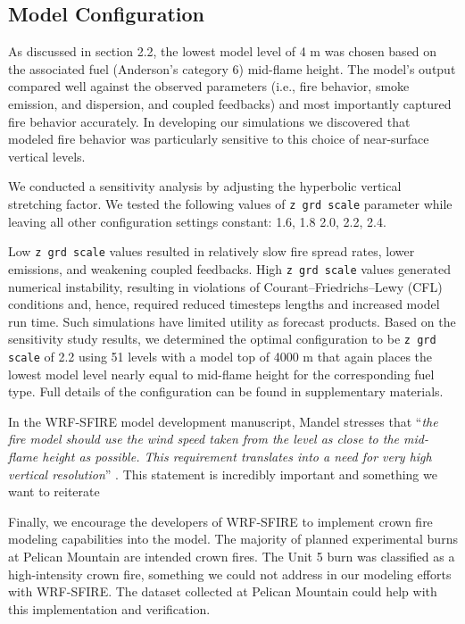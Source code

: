 \documentclass[preprints,article,accept,moreauthors,pdftex]{Definitions/mdpi}
\begin{document}
\subsection{Model Configuration}

As discussed in section 2.2, the lowest model level of 4 m was chosen based on the associated fuel (Anderson's category 6) mid-flame height. The model’s output compared well against the observed parameters (i.e., fire behavior, smoke emission, and dispersion, and coupled feedbacks) and most importantly captured fire behavior accurately. In developing our simulations we discovered that modeled fire behavior was particularly sensitive to this choice of near-surface vertical levels.

We conducted a sensitivity analysis by adjusting the hyperbolic vertical stretching factor. We tested the following values of \texttt{z grd scale} parameter while leaving all other configuration settings constant: 1.6, 1.8 2.0, 2.2, 2.4.

Low \texttt{z grd scale} values resulted in relatively slow fire spread rates, lower emissions, and weakening coupled feedbacks. High \texttt{z grd scale} values generated numerical instability, resulting in violations of Courant–Friedrichs–Lewy (CFL) conditions and, hence, required reduced timesteps lengths and increased model run time. Such simulations have limited utility as forecast products. Based on the sensitivity study results, we determined the optimal configuration to be \texttt{z grd scale} of 2.2 using 51 levels with a model top of 4000 m that again places the lowest model level nearly equal to mid-flame height for the corresponding fuel type. Full details of the configuration can be found in supplementary materials.

In the WRF-SFIRE model development manuscript, Mandel stresses that ``\textit{the fire model should use the wind speed taken from the level as close to the mid-flame height as possible. This requirement translates into a need for very high vertical resolution}'' \cite{mandel_coupled_2011}. This statement is incredibly important and something we want to reiterate

Finally, we encourage the developers of WRF-SFIRE to implement crown fire modeling capabilities into the model. The majority of planned experimental burns at Pelican Mountain are intended crown fires. The Unit 5 burn was classified as a high-intensity crown fire, something we could not address in our modeling efforts with WRF-SFIRE. The dataset collected at Pelican Mountain could help with this implementation and verification.
\end{document}
